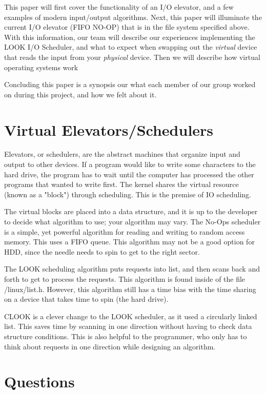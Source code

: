 \documentclass[onecolumn, draftclsnofoot,10pt, compsoc]{IEEEtran}
\begin{document}
		 This paper will first cover the functionality of an I/O elevator, and a few examples of modern input/output algorithms. 
		 Next, this paper will illuminate the current I/O elevator (FIFO NO-OP) that is in the file system specified above. 
		 With this information, our team will describe our experiences implementing the LOOK I/O Scheduler, and what to expect when swapping out the \textit{virtual} device that reads the input from your \textit{physical} device.
         Then we will describe how virtual operating systems work

		 Concluding this paper is a synopsis our what each member of our group worked on during this project, and how we felt about it.


		 \section{Virtual Elevators/Schedulers}
            Elevators, or schedulers, are the abstract machines that organize input and output to other devices. If a program would like to write some characters to the hard drive, the program has to wait until the computer has processed the other programs that wanted to write first. The kernel shares the virtual resource (known as a "block") through scheduling. This is the premise of IO scheduling.

            The virtual blocks are placed into a data structure, and it is up to the developer to decide what algorithm to use; your algorithm may vary.
            The No-Ops scheduler is a simple, yet powerful algorithm for reading and writing to random access memory. This uses a FIFO queue. This algorithm may not be a good option for HDD, since the needle needs to spin to get to the right sector. 

            The LOOK scheduling algorithm puts requests into list, and then scans back and forth to get to process the requests. This algorithm is found inside of the file /linux/list.h. However, this algorithm still has a time bias with the time sharing on a device that takes time to spin (the hard drive).

            CLOOK is a clever change to the LOOK scheduler, as it used a circularly linked list. This saves time by scanning in one direction without having to check data structure conditions. This is also helpful to the programmer, who only has to think about requests in one direction while designing an algorithm.
                   
        \section{Questions}
        
\end{document}
